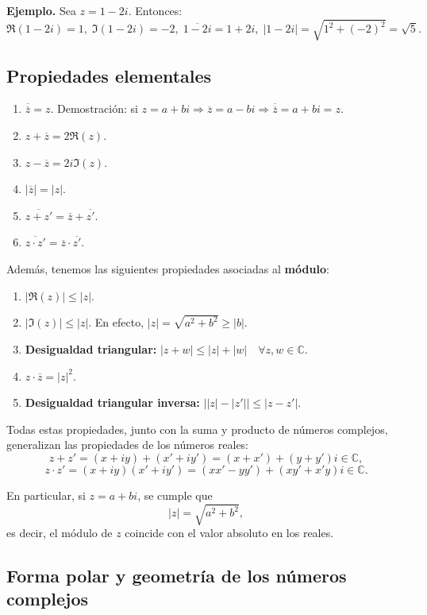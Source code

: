 \documentclass[a4paper,12pt]{article}
\begin{document}
\noindent\textbf{Ejemplo.} Sea \( z = 1 - 2i \). Entonces:
\[
\Re(1-2i) = 1, \; \Im(1-2i) = -2, \; \overline{1-2i} = 1 + 2i, \; |1-2i| = \sqrt{1^2 + (-2)^2} = \sqrt{5}.
\]

\subsection{Propiedades elementales}

\begin{enumerate}
    \item $\overline{\overline{z}} = z$. \; Demostración: si $z = a + bi \Rightarrow \overline{z} = a - bi \Rightarrow \overline{\overline{z}} = a + bi = z$.
    \item $z + \overline{z} = 2 \Re(z)$.
    \item $z - \overline{z} = 2i \Im(z)$.
    \item $|\overline{z}| = |z|$.
    \item $\overline{z + z'} = \overline{z} + \overline{z'}$.
    \item $\overline{z \cdot z'} = \overline{z} \cdot \overline{z'}$.
\end{enumerate}

Además, tenemos las siguientes propiedades asociadas al \textbf{módulo}:
\begin{enumerate}
    \item $|\Re(z)| \leq |z|$.
    \item $|\Im(z)| \leq |z|$. \; En efecto, $|z| = \sqrt{a^2 + b^2} \geq |b|$.
    \item \textbf{Desigualdad triangular:} \; $|z+w| \leq |z| + |w| \quad \forall z,w \in \mathbb{C}$.
    \item $z \cdot \overline{z} = |z|^2$.
    \item \textbf{Desigualdad triangular inversa:} \; $\big||z| - |z'|\big| \leq |z-z'|$.
\end{enumerate}

Todas estas propiedades, junto con la suma y producto de números complejos, generalizan las propiedades de los números reales:
\[
z+z' = (x+iy) + (x' + i y') = (x+x') + (y+y')i \in \mathbb{C},
\]
\[
z \cdot z' = (x+iy)(x'+iy') = (xx'-yy') + (xy'+x'y)i \in \mathbb{C}.
\]

En particular, si $z = a + bi$, se cumple que
\[
|z| = \sqrt{a^2 + b^2},
\]
es decir, el módulo de $z$ coincide con el valor absoluto en los reales.

\subsection{Forma polar y geometría de los números complejos}
\end{document}
